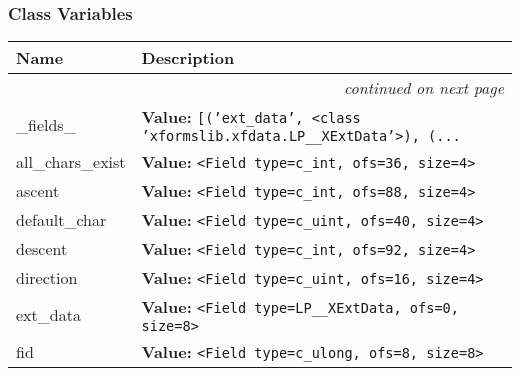 
  \subsubsection{Class Variables}

    \vspace{-1cm}
\hspace{\varindent}\begin{longtable}{|p{\varnamewidth}|p{\vardescrwidth}|l}
\cline{1-2}
\cline{1-2} \centering \textbf{Name} & \centering \textbf{Description}& \\
\cline{1-2}
\endhead\cline{1-2}\multicolumn{3}{r}{\small\textit{continued on next page}}\\\endfoot\cline{1-2}
\endlastfoot\raggedright \_\-f\-i\-e\-l\-d\-s\-\_\- & \raggedright \textbf{Value:} 
{\tt \texttt{[}\texttt{(}\texttt{'}\texttt{ext\_data}\texttt{'}\texttt{, }{\textless}class 'xformslib.xfdata.LP\_\_XExtData'{\textgreater}\texttt{)}\texttt{, }\texttt{(}\texttt{...}}&\\
\cline{1-2}
\raggedright a\-l\-l\-\_\-c\-h\-a\-r\-s\-\_\-e\-x\-i\-s\-t\- & \raggedright \textbf{Value:} 
{\tt {\textless}Field type=c\_int, ofs=36, size=4{\textgreater}}&\\
\cline{1-2}
\raggedright a\-s\-c\-e\-n\-t\- & \raggedright \textbf{Value:} 
{\tt {\textless}Field type=c\_int, ofs=88, size=4{\textgreater}}&\\
\cline{1-2}
\raggedright d\-e\-f\-a\-u\-l\-t\-\_\-c\-h\-a\-r\- & \raggedright \textbf{Value:} 
{\tt {\textless}Field type=c\_uint, ofs=40, size=4{\textgreater}}&\\
\cline{1-2}
\raggedright d\-e\-s\-c\-e\-n\-t\- & \raggedright \textbf{Value:} 
{\tt {\textless}Field type=c\_int, ofs=92, size=4{\textgreater}}&\\
\cline{1-2}
\raggedright d\-i\-r\-e\-c\-t\-i\-o\-n\- & \raggedright \textbf{Value:} 
{\tt {\textless}Field type=c\_uint, ofs=16, size=4{\textgreater}}&\\
\cline{1-2}
\raggedright e\-x\-t\-\_\-d\-a\-t\-a\- & \raggedright \textbf{Value:} 
{\tt {\textless}Field type=LP\_\_XExtData, ofs=0, size=8{\textgreater}}&\\
\cline{1-2}
\raggedright f\-i\-d\- & \raggedright \textbf{Value:} 
{\tt {\textless}Field type=c\_ulong, ofs=8, size=8{\textgreater}}&\\

\end{longtable}
